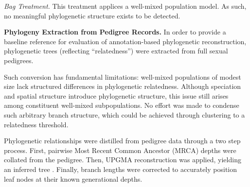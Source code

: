 \textit{Bag Treatment.}
This treatment applices a well-mixed population model.
As such, no meaningful phylogenetic structure exists to be detected.

\textbf{Phylogeny Extraction from Pedigree Records.}
In order to provide a baseline reference for evaluation of annotation-based phylogenetic reconstruction, phylogenetic trees (reflecting ``relatedness'') were extracted from full sexual pedigrees.

Such conversion has fundamental limitations: well-mixed populations of modest size lack structured differences in phylogenetic relatedness.
Although speciation and spatial structure introduce phylogenetic structure, this issue still arises among constituent well-mixed subpopulations.
No effort was made to condense such arbitrary branch structure, which could be achieved through clustering to a relatedness threshold.

Phylogenetic relationships were distilled from pedigree data through a two step process.
First, pairwise Most Recent Common Ancestor (MRCA) depths were collated from the pedigree.
Then, UPGMA reconstruction was applied, yielding an inferred tree \citep{sokal1958university}.
Finally, branch lengths were corrected to accurately position leaf nodes at their known generational depths.
